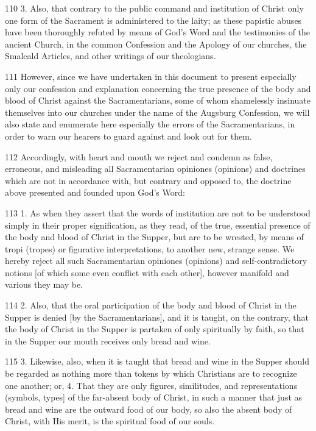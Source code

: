 110 3. Also, that contrary to the public command and institution of Christ only one form of the Sacrament is administered to the laity; as these papistic abuses have been thoroughly refuted by means of God’s Word and the testimonies of the ancient Church, in the common Confession and the Apology of our churches, the Smalcald Articles, and other writings of our theologians.

111 However, since we have undertaken in this document to present especially only our confession and explanation concerning the true presence of the body and blood of Christ against the Sacramentarians, some of whom shamelessly insinuate themselves into our churches under the name of the Augsburg Confession, we will also state and enumerate here especially the errors of the Sacramentarians, in order to warn our hearers to guard against and look out for them.

112 Accordingly, with heart and mouth we reject and condemn as false, erroneous, and misleading all Sacramentarian opiniones (opinions) and doctrines which are not in accordance with, but contrary and opposed to, the doctrine above presented and founded upon God’s Word:

113 1. As when they assert that the words of institution are not to be understood simply in their proper signification, as they read, of the true, essential presence of the body and blood of Christ in the Supper, but are to be wrested, by means of tropi (tropes) or figurative interpretations, to another new, strange sense. We hereby reject all such Sacramentarian opiniones (opinions) and self-contradictory notions [of which some even conflict with each other], however manifold and various they may be.

114 2. Also, that the oral participation of the body and blood of Christ in the Supper is denied [by the Sacramentarians], and it is taught, on the contrary, that the body of Christ in the Supper is partaken of only spiritually by faith, so that in the Supper our mouth receives only bread and wine.

115 3. Likewise, also, when it is taught that bread and wine in the Supper should be regarded as nothing more than tokens by which Christians are to recognize one another; or, 4. That they are only figures, similitudes, and representations (symbols, types] of the far-absent body of Christ, in such a manner that just as bread and wine are the outward food of our body, so also the absent body of Christ, with His merit, is the spiritual food of our souls.

